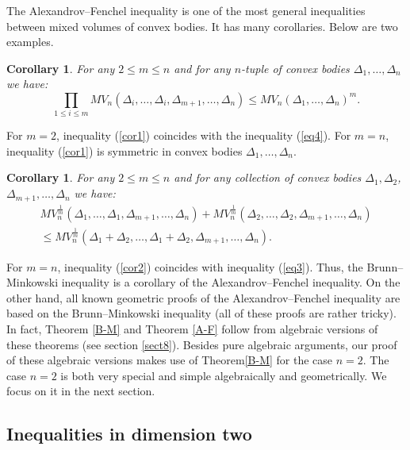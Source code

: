 \documentclass[11pt]{article}
\theoremstyle{plain}
\newtheorem{corollary}[theorem]{Corollary}
\theoremstyle{definition}
\begin{document}
The Alexandrov--Fenchel inequality is one of the most  general inequalities between mixed volumes of convex bodies. It has many corollaries. Below are two examples.

\begin{corollary}\label{AFcor1} For any $2\leq m\leq n$ and for any   $n$-tuple of convex bodies $\Delta_1,\dots, \Delta_n$ we have:
\begin{equation}\label{cor1}
 \prod_{1\leq i\leq m} MV_n (\Delta_i,\dots,\Delta_i, \Delta_{m+1}, \dots, \Delta_n)\leq MV_n (\Delta_1,\dots,\Delta_n)^m.
 \end{equation}
\end{corollary}

For $m=2$, inequality (\ref{cor1}) coincides with the inequality (\ref{eq4}). For $m=n$, inequality (\ref{cor1}) is symmetric in  convex bodies $\Delta_1,\dots,\Delta_n$.

\begin{corollary}\label{AFcor2}  For any $2\leq m\leq n$ and for any collection of convex bodies $\Delta_1, \Delta_2$, $\Delta_{m+1},\dots,\Delta_n$ we have:
\begin{equation}\label{cor2}\begin{aligned}
MV_n^{\frac{1}{m}}(\Delta_1,\dots,\Delta_1,\Delta_{m+1},\dots,\Delta_n)+ MV_n^{\frac{1}{m}}(\Delta_2,\dots,\Delta_2,\Delta_{m+1},\dots,\Delta_n)\\
\leq MV_n^{\frac{1}{m}}(\Delta_1+\Delta_2,\dots,\Delta_1+\Delta_2,\Delta_{m+1},\dots,\Delta_n).\end{aligned}
\end{equation}
\end{corollary}

For $m=n$, inequality (\ref{cor2}) coincides with inequality (\ref{eq3}). Thus, the  Brunn--Minkowski inequality is  a corollary of the Alexandrov--Fenchel inequality. On the other hand, all known geometric proofs of the Alexandrov--Fenchel inequality are based on the Brunn--Minkowski inequality (all of  these proofs are rather tricky). In fact,  Theorem \ref{B-M} and  Theorem \ref{A-F}  follow from  algebraic versions of these theorems (see section \ref{sect8}).  Besides pure algebraic arguments, our proof of these algebraic versions  makes use of Theorem\ref{B-M} for the case $n=2$. The case $n=2$ is both very special and simple algebraically and geometrically.  We focus on it in the next section.




\subsection{Inequalities in dimension two}
\end{document}
